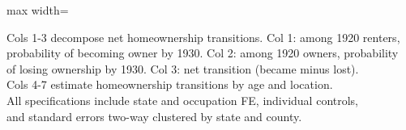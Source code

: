 \begin{table}[htbp]
\begin{adjustbox}{max width=\textwidth}
   \end{adjustbox}

   \par \raggedright 
   Cols 1-3 decompose net homeownership transitions. Col 1: among 1920 renters,\\
   probability of becoming owner by 1930. Col 2: among 1920 owners, probability\\
   of losing ownership by 1930. Col 3: net transition (became minus lost).\\
   Cols 4-7 estimate homeownership transitions by age and location.\\
   All specifications include state and occupation FE, individual controls,\\
   and standard errors two-way clustered by state and county.
\end{table}


